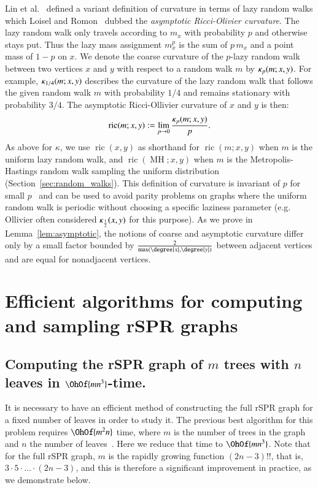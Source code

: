 \documentclass[]{elsarticle}
\newcommand{\MH}{\operatorname{MH}}
\newcommand{\curvature}[2][]{%
    \ifthenelse{\equal{#1}{}}%
		{\kappa(#2)}%
		{\kappa_{#1}(#2)}%
}
\newcommand{\ric}[1]{
	\operatorname{ric}(#1)%
}
\begin{document}
Lin et al.~\citep{lin2011ricci} defined a variant definition of curvature in terms of lazy random walks which Loisel and Romon~\citep{Loisel2014-hu} dubbed the \emph{asymptotic Ricci-Olivier curvature}.
The lazy random walk only travels according to $m_x$ with probability $p$ and otherwise stays put.
Thus the lazy mass assignment $m^p_x$ is the sum of $p\, m_x$ and a point mass of $1 - p$ on $x$.
We denote the coarse curvature of the $p$-lazy random walk between two vertices $x$ and $y$ with respect to a random walk $m$ by $\curvature[p]{m; x,y}$.
For example, $\curvature[1/4]{m; x,y}$ describes the curvature of the lazy random walk that follows the given random walk $m$ with probability $1/4$ and remains stationary with probability $3/4$.
The asymptotic Ricci-Ollivier curvature of $x$ and $y$ is then:
\begin{equation}
\ric{m; x, y} := \lim_{p \rightarrow 0} \frac{\curvature[p]{m; x,y}}{p} .
\label{eq:asympCurvatureDef}
\end{equation}
As above for $\kappa$, we use $\ric{x, y}$ as shorthand for $\ric{m; x, y}$ when $m$ is the uniform lazy random walk, and $\ric{\MH; x, y}$ when $m$ is the Metropolis-Hastings random walk sampling the uniform distribution (Section~\ref{sec:random_walks}).
This definition of curvature is invariant of $p$ for small $p$~\citep{Loisel2014-hu} and can be used to avoid parity problems on graphs where the uniform random walk is periodic without choosing a specific laziness parameter (e.g. Ollivier often considered $\curvature[\frac{1}{2}]{x,y}$ for this purpose).
As we prove in Lemma~\ref{lem:asymptotic}, the notions of coarse and asymptotic curvature differ only by a small factor bounded by $\frac{2}{\max(\degree{x}, \degree{y})}$ between adjacent vertices and are equal for nonadjacent vertices.

\section{Efficient algorithms for computing and sampling rSPR graphs}

\subsection{Computing the rSPR graph of $m$ trees with $n$ leaves in $\OhOf{mn^3}$-time.}
\label{sec:computing_treespace}

It is necessary to have an efficient method of constructing the full rSPR graph for a fixed number of leaves in order to study it.
The previous best algorithm for this problem requires $\OhOf{m^2 n}$ time, where $m$ is the number of trees in the graph and $n$ the number of leaves~\citep{Whidden2015-yi}.
Here we reduce that time to $\OhOf{mn^3}$.
Note that for the full rSPR graph, $m$ is the rapidly growing function $(2n-3)!!$, that is, $3 \cdot 5 \cdot \ldots \cdot (2n-3)$, and this is therefore a significant improvement in practice, as we demonstrate below.
\end{document}
